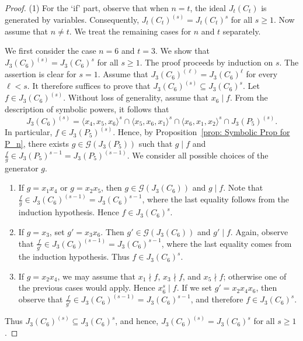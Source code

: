 \documentclass[10pt,a4paper]{amsart}
\def\l{\langle}
\def\r{\rangle}
\begin{document}
\begin{proof}
    \medskip \noindent
    (1) For the `if' part, observe that when $n=t$, the ideal $J_t(C_t)$ is generated by variables. Consequently, $J_t(C_t)^{(s)} = J_t(C_t)^s$ for all $s \ge 1$. Now assume that $n \ne t$. We treat the remaining cases for $n$ and $t$ separately.

    
    We first consider the case $n=6$ and $t=3$. We show that $J_3(C_6)^{(s)} = J_3(C_6)^s$ for all $s \ge 1$. The proof proceeds by induction on $s$. The assertion is clear for $s=1$. Assume that $J_3(C_6)^{(\ell)} = J_3(C_6)^{\ell}$ for every $\ell < s$. It therefore suffices to prove that $J_3(C_6)^{(s)} \subseteq J_3(C_6)^s.$ Let $f \in J_3(C_6)^{(s)}$. Without loss of generality, assume that $x_6 \mid f$. From the description of symbolic powers, it follows that
    \[
    J_3(C_6)^{(s)} =\l x_4,x_5,x_6 \r^s
    \cap \l x_5,x_6,x_1\r^s
    \cap \l x_6,x_1,x_2 \r^s
    \cap J_3(P_5)^{(s)}.
    \]
    In particular, $f \in J_3(P_5)^{(s)}$. Hence, by Proposition~\ref{prop: Symbolic Prop for P_n}, there exists $g \in \mathcal{G}(J_3(P_5))$ such that $g \mid f$ and $\frac{f}{g} \in J_3(P_5)^{s-1}= J_3(P_5)^{(s-1)}.$ We consider all possible choices of the generator $g$.
    \begin{enumerate}
        \item If $g = x_1x_4$ or $g = x_2x_5$, then $g \in \mathcal{G}(J_3(C_6))$ and $g \mid f$. Note that $\frac{f}{g} \in J_3(C_6)^{(s-1)} = J_3(C_6)^{s-1}$, where the last equality follows from the induction hypothesis. Hence $f \in J_3(C_6)^s$.

        \item If $g = x_3$, set $g' = x_3x_6$. Then $g' \in \mathcal{G}(J_3(C_6))$ and $g' \mid f$. Again, observe that $\frac{f}{g'} \in J_3(C_6)^{(s-1)} = J_3(C_6)^{s-1}$, where the last equality comes from the induction hypothesis. Thus $f \in J_3(C_6)^s$.

        \item If $g = x_2x_4$, we may assume that $x_1 \nmid f$, $x_3 \nmid f$, and $x_5 \nmid f$; otherwise one of the previous cases would apply. Hence $x_6^s \mid f$. If we set $g' = x_2x_4x_6$, then observe that $\frac{f}{g'} \in J_3(C_6)^{(s-1)} = J_3(C_6)^{s-1}$, and therefore $f \in J_3(C_6)^s$.
    \end{enumerate}
    Thus $J_3(C_6)^{(s)} \subseteq J_3(C_6)^s$, and hence, $J_3(C_6)^{(s)} = J_3(C_6)^s$ for all $s \ge 1$.



\end{proof}
\end{document}
